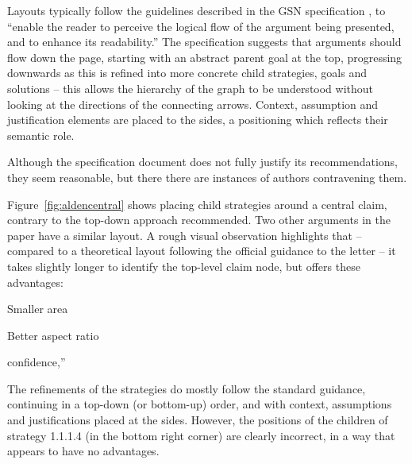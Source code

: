 Layouts typically follow the guidelines described in the GSN specification \citep[section~2.2, pp.~26--27]{gsnstandard}, 
to ``enable the reader to perceive the logical flow of the argument being presented, and to enhance its readability.''
The specification suggests that arguments should flow down the page, starting with an abstract parent goal at the top, progressing downwards as this is refined into more concrete child strategies, goals and solutions -- this allows the hierarchy of the graph to be understood without looking at the directions of the connecting arrows.
Context, assumption and justification elements are placed to the sides, a positioning which reflects their semantic role.

Although the specification document does not fully justify its recommendations, they seem reasonable, but there there are instances of authors contravening them.

Figure~\ref{fig:aldencentral} shows \citet{royal} placing child strategies around a central claim, contrary to the top-down approach recommended. Two other arguments in the paper \cite[pp.~8--9]{royal} have a similar layout.
A rough visual observation highlights that -- compared to a theoretical layout following the official guidance to the letter -- it takes slightly longer to identify the top-level claim node, but offers these advantages:

\begin{itemize*}
\item Smaller area
\item Better aspect ratio
\item 
\end{itemize*}confidence,”

The refinements of the strategies do mostly follow the standard guidance, continuing in a top-down (or bottom-up) order, and with context, assumptions and justifications placed at the sides. However, the positions of the children of strategy 1.1.1.4 (in the bottom right corner) are clearly incorrect, in a way that appears to have no advantages.

